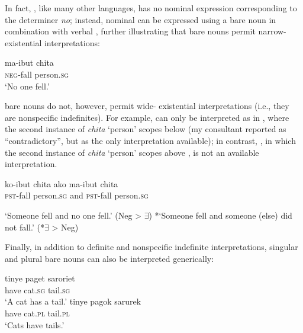 \documentclass[output=paper]{LSP/langsci}
\begin{document}
 In fact, , like many other languages, has no nominal expression corresponding to the  determiner \textit{no}; instead, nominal  can be expressed using a bare noun in combination with verbal , further illustrating that bare nouns permit narrow- existential interpretations:

\ea \label{ex:landman:negbarenoun}
  \gll ma-ibut chita\\	
	   \textsc{neg}-fall person.\textsc{sg}\\
\glt ‘No one fell.’
\z 

 bare nouns do not, however, permit wide- existential interpretations (i.e., they are nonspecific indefinites). For example,  can only be interpreted as in , where the second instance of \textit{chita} ‘person’ scopes below  (my consultant reported  as \textquotedblleft contradictory\textquotedblright, but as the only interpretation available); in contrast, , in which the second instance of \textit{chita} ‘person’ scopes above , is not an available interpretation.

\begin{exe}
\ex \label{ex:landman:scopesg}
  \gll ko-ibut chita ako ma-ibut chita\\	
	   \textsc{pst}-fall person.\textsc{sg} and \textsc{pst}-fall person.\textsc{sg}\\
  \begin{xlist}
  \ex \label{ex:landman:narrow}‘Someone fell and no one fell.’ (Neg > $\exists$)
  \ex \label{ex:landman:wide} *‘Someone fell and someone (else) did not fall.’ (*$\exists$ > Neg)
  \end{xlist}   
\end{exe}

Finally, in addition to definite and nonspecific indefinite interpretations, singular and plural bare nouns can also be interpreted generically:

\ea   
  \ea \label{ex:landman:gensg}
     \gll tinye paget saroriet\\
          have cat.\textsc{sg} tail.\textsc{sg}\\ 
     \glt ‘A cat has a tail.’
  \ex \label{ex:landman:genpl}
     \gll tinye pagok sarurek\\
          have cat.\textsc{pl} tail.\textsc{pl}\\ 
     \glt ‘Cats have tails.’
  \z
\z 
\end{document}
